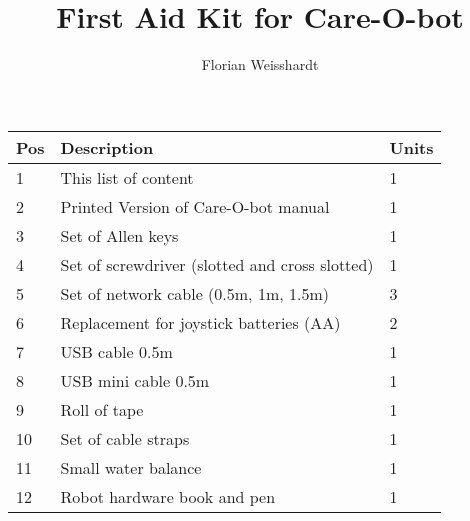 \documentclass{article}
\title{First Aid Kit for Care-O-bot} %
\author{Florian Weisshardt} %
\begin{document}
\maketitle %

\begin{tabular}{|l|l|l|}
\hline
\textbf{Pos} & \textbf{Description} & \textbf{Units}\\
\hline\hline
1 & This list of content & 1\\
2 & Printed Version of Care-O-bot manual & 1\\
3 & Set of Allen keys & 1\\
4 & Set of screwdriver (slotted and cross slotted) & 1\\
5 & Set of network cable (0.5m, 1m, 1.5m) & 3\\
6 & Replacement for joystick batteries (AA) & 2\\
7 & USB cable 0.5m & 1\\
8 & USB mini cable 0.5m & 1\\
9 & Roll of tape & 1\\
10 & Set of cable straps & 1\\
11 & Small water balance & 1\\
12 & Robot hardware book and pen & 1\\
\hline
\end{tabular}
\end{document}

